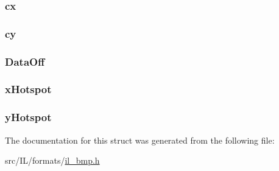 \hypertarget{struct_o_s2___h_e_a_d_a056c5b3b64268265fefb765e17f5434a}{
\subsubsection[{cx}]{ cx}}\label{struct_o_s2___h_e_a_d_a056c5b3b64268265fefb765e17f5434a}
\hypertarget{struct_o_s2___h_e_a_d_a5226d513873fb17e513a5f9dee05f5bc}{
\subsubsection[{cy}]{ cy}}\label{struct_o_s2___h_e_a_d_a5226d513873fb17e513a5f9dee05f5bc}
\hypertarget{struct_o_s2___h_e_a_d_ae8d05a40ffdae0d5eeda790d969f79f4}{
\subsubsection[{Data\-Off}]{ Data\-Off}}\label{struct_o_s2___h_e_a_d_ae8d05a40ffdae0d5eeda790d969f79f4}
\hypertarget{struct_o_s2___h_e_a_d_affcb3f103c1fe344216fec7da1b005b7}{
\subsubsection[{x\-Hotspot}]{ x\-Hotspot}}\label{struct_o_s2___h_e_a_d_affcb3f103c1fe344216fec7da1b005b7}
\hypertarget{struct_o_s2___h_e_a_d_a3942449af717e5b78aea818cb7a24c89}{
\subsubsection[{y\-Hotspot}]{ y\-Hotspot}}\label{struct_o_s2___h_e_a_d_a3942449af717e5b78aea818cb7a24c89}


The documentation for this struct was generated from the following file\-:\begin{DoxyCompactItemize}
\item 
src/\-I\-L/formats/\hyperlink{il__bmp_8h}{il\-\_\-bmp.\-h}\end{DoxyCompactItemize}
